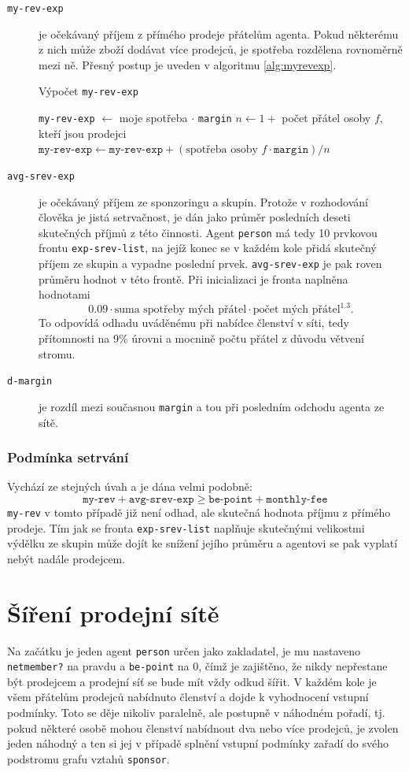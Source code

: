 \documentclass[a4wide,12pt]{report}
\begin{document}
\begin{description}
\item[\texttt{my-rev-exp}] je očekávaný příjem z přímého prodeje přátelům agenta. Pokud některému z nich může zboží dodávat více prodejců, je spotřeba rozdělena rovnoměrně mezi ně. Přesný postup je uveden v algoritmu \ref{alg:myrevexp}.
\begin{algorithm}
\caption{Výpočet \texttt{my-rev-exp}}
\label{alg:myrevexp}
\begin{algorithmic}[]
\STATE \texttt{my-rev-exp} $\gets$ moje spotřeba $\cdot$ \texttt{margin}
  \STATE $n\gets 1 + $ počet přátel osoby $f$, kteří jsou prodejci
  \STATE $\texttt{my-rev-exp}\gets\texttt{my-rev-exp}+(\text{spotřeba osoby }f \cdot \texttt{margin}) / n$
\ENDFOR
\end{algorithmic}
\end{algorithm}
\item[\texttt{avg-srev-exp}] je očekávaný příjem ze sponzoringu a skupin. Protože v rozhodování člověka je jistá setrvačnost, je dán jako průměr posledních deseti skutečných příjmů z této činnosti. Agent \texttt{person} má tedy 10 prvkovou frontu \texttt{exp-srev-list}, na jejíž konec se v každém kole přidá skutečný příjem ze skupin a vypadne poslední prvek. \texttt{avg-srev-exp} je pak roven průměru hodnot v této frontě. Při inicializaci je fronta naplněna hodnotami
\[ 0.09\cdot \text{suma spotřeby mých přátel}\cdot \text{počet mých přátel}^{1.3}.\]
To odpovídá odhadu uváděnému při nabídce členství v síti, tedy přítomnosti na 9\% úrovni a mocnině počtu přátel z důvodu větvení stromu.
\item[\texttt{d-margin}] je rozdíl mezi současnou \texttt{margin} a tou při posledním odchodu agenta ze sítě.
\end{description}
\subsubsection{Podmínka setrvání}
Vychází ze stejných úvah a je dána velmi podobně:
\[ \texttt{my-rev} + \texttt{avg-srev-exp} \geq \texttt{be-point} + \texttt{monthly-fee} \]
\texttt{my-rev} v tomto případě již není odhad, ale skutečná hodnota příjmu z přímého prodeje. Tím jak se fronta \texttt{exp-srev-list} naplňuje skutečnými velikostmi výdělku ze skupin může dojít ke snížení jejího průměru a agentovi se pak vyplatí nebýt nadále prodejcem.
\section{Šíření prodejní sítě}
\label{sec:spread}
Na začátku je jeden agent \texttt{person} určen jako zakladatel, je mu nastaveno \texttt{netmember?} na pravdu a \texttt{be-point} na 0, čímž je zajištěno, že nikdy nepřestane být prodejcem a prodejní síť se bude mít vždy odkud šířit. V každém kole je všem přátelům prodejců nabídnuto členství a dojde k vyhodnocení vstupní podmínky. Toto se děje nikoliv paralelně, ale postupně v náhodném pořadí, tj. pokud některé osobě mohou členství nabídnout dva nebo více prodejců, je zvolen jeden náhodný a ten si jej v případě splnění vstupní podmínky zařadí do svého podstromu grafu vztahů \texttt{sponsor}.
\end{document}

